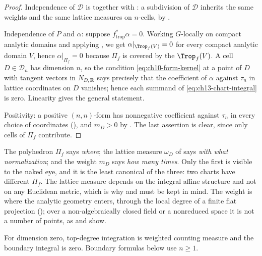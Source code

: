\begin{proof}
Independence of $\mathscr D$ is 
together with : a subdivision of
$\mathscr D$ inherits the same weights and the same lattice measures on
$n$-cells, by .

Independence of $P$ and $\alpha$: suppose $f_{\mathrm{trop}}^*\alpha=0$.
Working $G$-locally on compact analytic domains and applying
, we get $\alpha|_{\Trop_f(V)}=0$ for every compact
analytic domain $V$, hence $\alpha|_{\Pi_f}=0$ because $\Pi_f$ is covered by
the $\Trop_f(V)$.  A cell $D\in\mathscr D_n$ has dimension $n$, so the
condition \eqref{eq:ch10-form-kernel} at a point of $D$ with tangent vectors
in $N_{D,\mathbf R}$ says precisely that the coefficient of $\alpha$ against
$\tau_n$ in lattice coordinates on $D$ vanishes; hence each summand of
\eqref{eq:ch13-chart-integral} is zero.  Linearity gives the general
statement.

Positivity: a positive $(n,n)$-form has nonnegative coefficient against
$\tau_n$ in every choice of coordinates (),
and $m_D>0$ by .  The last assertion is
clear, since only cells of $\Pi_f$ contribute.
\end{proof}

\begin{remark}
\label{rem:ch13-three-factors}
The polyhedron $\Pi_f$ says \emph{where}; the lattice measure $\omega_D$
of  says \emph{with what normalization}; and
the weight $m_D$ says \emph{how many times}.  Only the first is visible to
the naked eye, and it is the least canonical of the three: two charts have
different $\Pi_f$.  The lattice measure depends on the integral affine
structure and not on any Euclidean metric, which is why
 and  must be
kept in mind.  The weight is where the analytic geometry enters, through the
local degree of a finite flat projection
(); over a non-algebraically closed
field or a nonreduced space it is not a number of points, as
 and  show.
\end{remark}

For dimension zero, top-degree integration is weighted counting measure
and the boundary integral is zero.  Boundary formulas below use $n\ge1$.

